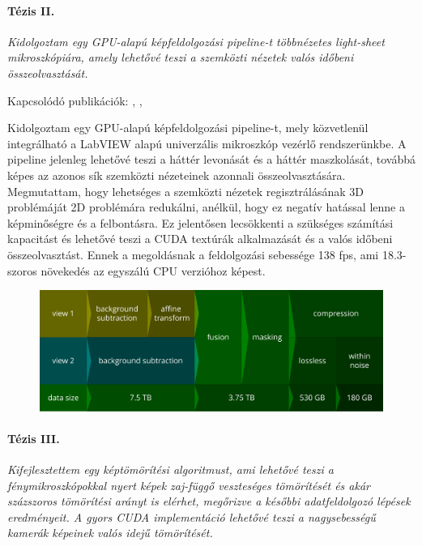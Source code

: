 \documentclass{booklet_style}
\begin{document}
  \paragraph{Tézis II.} \textit{Kidolgoztam egy GPU-alapú képfeldolgozási pipeline-t többnézetes light-sheet mikroszkópiára, amely lehetővé teszi a szemközti nézetek valós időbeni összeolvasztását.}

    Kapcsolódó publikációk: \cite{balazs_gpu-based_2016}, \cite{balazs_gpu-based_2016-1}, \cite{balazs_gpu-based_2017}

    Kidolgoztam egy GPU-alapú képfeldolgozási pipeline-t, mely közvetlenül integrálható a LabVIEW alapú univerzális mikroszkóp vezérlő rendszerünkbe. A pipeline jelenleg lehetővé teszi a háttér levonását és a háttér maszkolását, továbbá képes az azonos sík szemközti nézeteinek azonnali összeolvasztására. Megmutattam, hogy lehetséges a szemközti nézetek regisztrálásának 3D problémáját 2D problémára redukálni, anélkül, hogy ez negatív hatással lenne a képminőségre és a felbontásra. Ez jelentősen lecsökkenti a szükséges számítási kapacitást és lehetővé teszi a CUDA textúrák alkalmazását és a valós időbeni összeolvasztást. Ennek a megoldásnak a feldolgozási sebessége 138 fps, ami 18.3-szoros növekedés az egyszálú CPU verzióhoz képest.


    \begin{figure}
      \centering
      \includegraphics[width=\textwidth]{4_gpu/pipeline}
      \label{fig:pipeline}
    \end{figure}
    

  \paragraph{Tézis III.} \textit{Kifejlesztettem egy képtömörítési algoritmust, ami lehetővé teszi a fénymikroszkópokkal nyert képek zaj-függő veszteséges tömörítését és akár százszoros tömörítési arányt is elérhet, megőrizve a későbbi adatfeldolgozó lépések eredményeit. A gyors CUDA implementáció lehetővé teszi a nagysebességű kamerák képeinek valós idejű tömörítését.}
\end{document}
